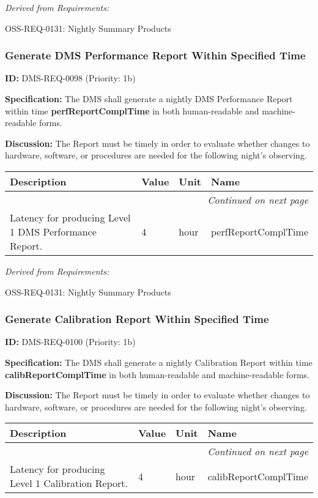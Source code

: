\documentclass[SE,toc,lsstdraft]{lsstdoc}
\makeatletter
\newcommand{\paramname}[1]{\hspace{0pt}#1}
\newcommand{\unitname}[1]{\hspace{0pt}#1}
\newenvironment{parameters}[0]{%
\setlength\LTleft{0pt}
\setlength\LTright{\fill}
\begin{small}
\begin{longtable}[]{|p{0.49\textwidth}|l|p{0.6in}|p{1.70in}@{}|}

\hline \textbf{Description} & \textbf{Value} & \textbf{Unit} & \textbf{Name} \\ \hline
\endhead

\hline \multicolumn{4}{r}{\emph{Continued on next page}} \\
\endfoot

\hline\hline
\endlastfoot
}{%
\hline
\end{longtable}
\end{small}
}
\makeatother
\begin{document}
\emph{Derived from Requirements:}

OSS-REQ-0131:
Nightly Summary Products \newline

\subsubsection{Generate DMS Performance Report Within Specified Time}

\label{DMS-REQ-0098}
\textbf{ID:} DMS-REQ-0098 (Priority: 1b)

\textbf{Specification:} The DMS shall generate a nightly DMS Performance Report within time \textbf{perfReportComplTime }in both human-readable and machine-readable forms.

\textbf{Discussion:} The Report must be timely in order to evaluate whether changes to hardware, software, or procedures are needed for the following night's observing.

\begin{parameters}
Latency for producing Level 1 DMS Performance Report.
&
4
&
\unitname{%
hour
}
&
\paramname{%
perfReportComplTime
} \\\hline
\end{parameters}

\emph{Derived from Requirements:}

OSS-REQ-0131:
Nightly Summary Products \newline

\subsubsection{Generate Calibration Report Within Specified Time}

\label{DMS-REQ-0100}
\textbf{ID:} DMS-REQ-0100 (Priority: 1b)

\textbf{Specification:} The DMS shall generate a nightly Calibration Report within time \textbf{calibReportComplTime }in both human-readable and machine-readable forms.

\textbf{Discussion:} The Report must be timely in order to evaluate whether changes to hardware, software, or procedures are needed for the following night's observing.

\begin{parameters}
Latency for producing Level 1 Calibration Report.
&
4
&
\unitname{%
hour
}
&
\paramname{%
calibReportComplTime
} \\\hline
\end{parameters}
\end{document}
